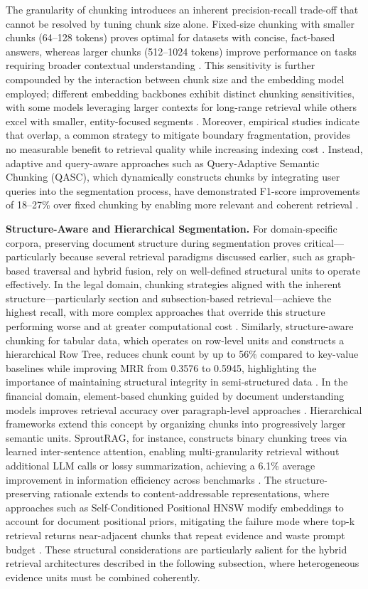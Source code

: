 \documentclass[11pt]{article}
\begin{document}
The granularity of chunking introduces an inherent precision-recall trade-off that cannot be resolved by tuning chunk size alone. Fixed-size chunking with smaller chunks (64--128 tokens) proves optimal for datasets with concise, fact-based answers, whereas larger chunks (512--1024 tokens) improve performance on tasks requiring broader contextual understanding \cite{ref82}. This sensitivity is further compounded by the interaction between chunk size and the embedding model employed; different embedding backbones exhibit distinct chunking sensitivities, with some models leveraging larger contexts for long-range retrieval while others excel with smaller, entity-focused segments \cite{ref82}. Moreover, empirical studies indicate that overlap, a common strategy to mitigate boundary fragmentation, provides no measurable benefit to retrieval quality while increasing indexing cost \cite{ref83}. Instead, adaptive and query-aware approaches such as Query-Adaptive Semantic Chunking (QASC), which dynamically constructs chunks by integrating user queries into the segmentation process, have demonstrated F1-score improvements of 18--27\% over fixed chunking by enabling more relevant and coherent retrieval \cite{ref84}.

\textbf{Structure-Aware and Hierarchical Segmentation.} For domain-specific corpora, preserving document structure during segmentation proves critical---particularly because several retrieval paradigms discussed earlier, such as graph-based traversal and hybrid fusion, rely on well-defined structural units to operate effectively. In the legal domain, chunking strategies aligned with the inherent structure---particularly section and subsection-based retrieval---achieve the highest recall, with more complex approaches that override this structure performing worse and at greater computational cost \cite{ref85}. Similarly, structure-aware chunking for tabular data, which operates on row-level units and constructs a hierarchical Row Tree, reduces chunk count by up to 56\% compared to key-value baselines while improving MRR from 0.3576 to 0.5945, highlighting the importance of maintaining structural integrity in semi-structured data \cite{ref86}. In the financial domain, element-based chunking guided by document understanding models improves retrieval accuracy over paragraph-level approaches \cite{ref87}. Hierarchical frameworks extend this concept by organizing chunks into progressively larger semantic units. SproutRAG, for instance, constructs binary chunking trees via learned inter-sentence attention, enabling multi-granularity retrieval without additional LLM calls or lossy summarization, achieving a 6.1\% average improvement in information efficiency across benchmarks \cite{ref88}. The structure-preserving rationale extends to content-addressable representations, where approaches such as Self-Conditioned Positional HNSW modify embeddings to account for document positional priors, mitigating the failure mode where top-k retrieval returns near-adjacent chunks that repeat evidence and waste prompt budget \cite{ref89}. These structural considerations are particularly salient for the hybrid retrieval architectures described in the following subsection, where heterogeneous evidence units must be combined coherently.
\end{document}
